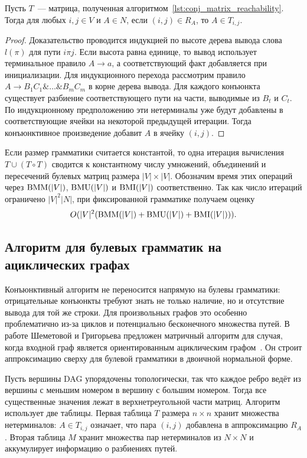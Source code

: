 \begin{theorem}
    Пусть $T$~--- матрица, полученная алгоритмом~\ref{lst:conj_matrix_reachability}. Тогда для любых $i,j \in V$ и $A \in N$, если $(i,j) \in R_A$, то $A \in T_{i,j}$.
\end{theorem}

\begin{proof}
    Доказательство проводится индукцией по высоте дерева вывода слова $l(\pi)$ для пути $i \pi j$. Если высота равна единице, то вывод использует терминальное правило $A \rightarrow a$, а соответствующий факт добавляется при инициализации. Для индукционного перехода рассмотрим правило $A \rightarrow B_1 C_1 \& \ldots \& B_m C_m$ в корне дерева вывода. Для каждого конъюнкта существует разбиение соответствующего пути на части, выводимые из $B_t$ и $C_t$. По индукционному предположению эти нетерминалы уже будут добавлены в соответствующие ячейки на некоторой предыдущей итерации. Тогда конъюнктивное произведение добавит $A$ в ячейку $(i,j)$.
\end{proof}

Если размер грамматики считается константой, то одна итерация вычисления $T \cup (T \circ T)$ сводится к константному числу умножений, объединений и пересечений булевых матриц размера $|V| \times |V|$. Обозначим время этих операций через $\operatorname{BMM}(|V|)$, $\operatorname{BMU}(|V|)$ и $\operatorname{BMI}(|V|)$ соответственно. Так как число итераций ограничено $|V|^2|N|$, при фиксированной грамматике получаем оценку
\[
    O(|V|^2(\operatorname{BMM}(|V|) + \operatorname{BMU}(|V|) + \operatorname{BMI}(|V|))).
\]

\subsection{Алгоритм для булевых грамматик на ациклических графах}
	\label{subsec:BooleanDAGReachabilityAlgorithm}

Конъюнктивный алгоритм не переносится напрямую на булевы грамматики: отрицательные конъюнкты требуют знать не только наличие, но и отсутствие вывода для той же строки. Для произвольных графов это особенно проблематично из-за циклов и потенциально бесконечного множества путей. В работе Шеметовой и Григорьева предложен матричный алгоритм для случая, когда входной граф является ориентированным ациклическим графом~. Он строит аппроксимацию сверху для булевой грамматики в двоичной нормальной форме.

Пусть вершины DAG упорядочены топологически, так что каждое ребро ведёт из вершины с меньшим номером в вершину с большим номером. Тогда все существенные значения лежат в верхнетреугольной части матриц. Алгоритм использует две таблицы. Первая таблица $T$ размера $n \times n$ хранит множества нетерминалов: $A \in T_{i,j}$ означает, что пара $(i,j)$ добавлена в аппроксимацию $R_A$. Вторая таблица $M$ хранит множества пар нетерминалов из $N \times N$ и аккумулирует информацию о разбиениях путей.

